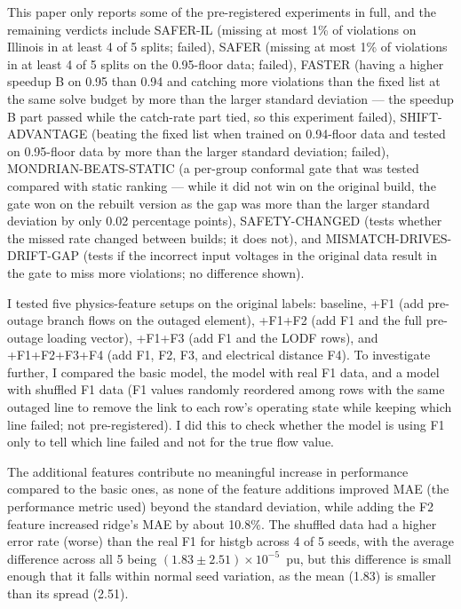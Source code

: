\documentclass[12pt]{article}
\begin{document}
This paper only reports some of the pre-registered experiments in full, and the remaining verdicts include SAFER-IL (missing at most 1\% of violations on Illinois in at least 4 of 5 splits; failed), SAFER (missing at most 1\% of violations in at least 4 of 5 splits on the 0.95-floor data; failed), FASTER (having a higher speedup B on 0.95 than 0.94 and catching more violations than the fixed list at the same solve budget by more than the larger standard deviation — the speedup B part passed while the catch-rate part tied, so this experiment failed), SHIFT-ADVANTAGE (beating the fixed list when trained on 0.94-floor data and tested on 0.95-floor data by more than the larger standard deviation; failed), MONDRIAN-BEATS-STATIC (a per-group conformal gate that was tested compared with static ranking — while it did not win on the original build, the gate won on the rebuilt version as the gap was more than the larger standard deviation by only 0.02 percentage points), SAFETY-CHANGED (tests whether the missed rate changed between builds; it does not), and MISMATCH-DRIVES-DRIFT-GAP (tests if the incorrect input voltages in the original data result in the gate to miss more violations; no difference shown).

I tested five physics-feature setups on the original labels: baseline, +F1 (add pre-outage branch flows on the outaged element), +F1+F2 (add F1 and the full pre-outage loading vector), +F1+F3 (add F1 and the LODF rows), and +F1+F2+F3+F4 (add F1, F2, F3, and electrical distance F4). To investigate further, I compared the basic model, the model with real F1 data, and a model with shuffled F1 data (F1 values randomly reordered among rows with the same outaged line to remove the link to each row’s operating state while keeping which line failed; not pre-registered). I did this to check whether the model is using F1 only to tell which line failed and not for the true flow value.

The additional features contribute no meaningful increase in performance compared to the basic ones, as none of the feature additions improved MAE (the performance metric used) beyond the standard deviation, while adding the F2 feature increased ridge’s MAE by about 10.8\%. The shuffled data had a higher error rate (worse) than the real F1 for histgb across 4 of 5 seeds, with the average difference across all 5 being $(1.83\pm2.51)\times 10^{-5}$~pu, but this difference is small enough that it falls within normal seed variation, as the mean (1.83) is smaller than its spread (2.51).
\end{document}
